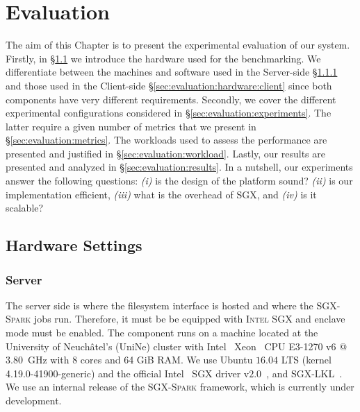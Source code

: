 \chapter{Evaluation} \label{chap:evaluation}

The aim of this Chapter is to present the experimental evaluation of our system.
Firstly, in \S\ref{sec:evaluation:hardware} we introduce the hardware used for the benchmarking.
We differentiate between the machines and software used in the Server-side \S\ref{sec:evaluation:hardware:server} and those used in the Client-side \S\ref{sec:evaluation:hardware:client} since both components have very different requirements.
Secondly, we cover the different experimental configurations considered in \S\ref{sec:evaluation:experiments}.
The latter require a given number of metrics that we present in \S\ref{sec:evaluation:metrics}.
The workloads used to assess the performance are presented and justified in \S\ref{sec:evaluation:workload}.
Lastly, our results are presented and analyzed in \S\ref{sec:evaluation:results}.
In a nutshell, our experiments answer the following questions: \emph{(i)} is the design of the platform sound? \emph{(ii)} is our implementation efficient, \emph{(iii)} what is the overhead of SGX, and \emph{(iv)} is it scalable?

\section{Hardware Settings} \label{sec:evaluation:hardware}

\subsection{Server} \label{sec:evaluation:hardware:server}
The server side is where the filesystem interface is hosted and where the \textsc{SGX-Spark} jobs run.
Therefore, it must be be equipped with \textsc{Intel SGX} and enclave mode must be enabled. 
The component runs on a machine located at the University of Neuch\^atel's (UniNe) cluster with Intel~\textregistered\xspace Xeon~\textregistered\xspace CPU E3-1270 v6 @ $3.80$~GHz with 8 cores and 64 GiB RAM. 
We use Ubuntu $16.04$ LTS (kernel 4.19.0-41900-generic) and the official Intel~\textregistered\xspace SGX driver v$2.0$~\cite{sgx-driver}, and \textsc{SGX-LKL}~\cite{sgx-lkl}. 
We use an internal release of the \textsc{SGX-Spark} framework, which is currently under development.

